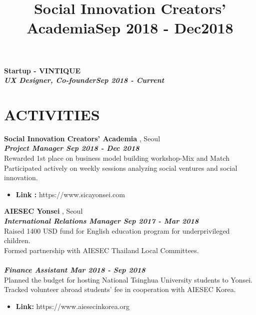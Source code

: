 \documentclass[margin]{res}
\begin{document}
\begin{resume}
\textbf{Startup - VINTIQUE
\\}
{\sl \textbf{UX Designer, Co-founder\hfill{Sep 2018 - Current}}}\\

\section{ACTIVITIES}
\location{}
\title{\textbf{Social Innovation Creators’ Academia\hfill Sep 2018 - Dec2018}}

{\textbf{Social Innovation Creators' Academia} , Seoul}\\
{\sl \textbf{Project Manager \hfill Sep 2018 - Dec 2018}}\\
Rewarded 1st place on business model building workshop-Mix and Match
\\Participated actively on weekly sessions analyzing social ventures and social innovation.
\begin{itemize}
\item \textbf{Link :} https://www.sicayonsei.com
\end{itemize}



\textbf{AIESEC Yonsei} , Seoul\\
{\sl \textbf{International Relations Manager \hfill Sep 2017 - Mar 2018}\\}
Raised 1400 USD fund for English education program for underprivileged children.\\
Formed partnership with AIESEC Thailand Local Committees.\\
\\{\sl\textbf{Finance Assistant \hfill Mar 2018 - Sep 2018}}\\
Planned the budget for hosting National Tsinghua University students to Yonsei.\\
Tracked volunteer abroad students’ fee in cooperation with AIESEC Korea.
\begin{itemize}
\item \textbf{Link:} https://www.aiesecinkorea.org 
\end{itemize}



\end{resume}
\end{document}
